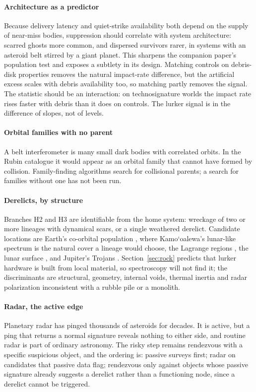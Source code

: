 \documentclass[preprint,12pt]{elsarticle}
\theoremstyle{definition}
\begin{document}
\paragraph{Architecture as a predictor} Because delivery latency and quiet-strike availability both depend on the supply of near-miss bodies, suppression should correlate with system architecture: scarred ghosts more common, and dispersed survivors rarer, in systems with an asteroid belt stirred by a giant planet. This sharpens the companion paper's population test and exposes a subtlety in its design. Matching controls on debris-disk properties removes the natural impact-rate difference, but the artificial excess scales with debris availability too, so matching partly removes the signal. The statistic should be an interaction: on technosignature worlds the impact rate rises faster with debris than it does on controls. The lurker signal is in the difference of slopes, not of levels.

\paragraph{Orbital families with no parent} A belt interferometer is many small dark bodies with correlated orbits. In the Rubin catalogue it would appear as an orbital family that cannot have formed by collision. Family-finding algorithms search for collisional parents; a search for families without one has not been run.

\paragraph{Derelicts, by structure} Branches H2 and H3 are identifiable from the home system: wreckage of two or more lineages with dynamical scars, or a single weathered derelict. Candidate locations are Earth's co-orbital population \citep{Benford2019}, where Kamo`oalewa's lunar-like spectrum \citep{Sharkey2021} is the natural cover a lineage would choose, the Lagrange regions \citep{HaqqMisraKopparapu2012}, the lunar surface \citep{DaviesWagner2013,Ellery2025}, and Jupiter's Trojans \citep{Levison2021}. Section~\ref{sec:rock} predicts that lurker hardware is built from local material, so spectroscopy will not find it; the discriminants are structural, geometry, internal voids, thermal inertia and radar polarization inconsistent with a rubble pile or a monolith.

\paragraph{Radar, the active edge} Planetary radar has pinged thousands of asteroids for decades. It is active, but a ping that returns a normal signature reveals nothing to either side, and routine radar is part of ordinary astronomy. The risky step remains rendezvous with a specific suspicious object, and the ordering is: passive surveys first; radar on candidates that passive data flag; rendezvous only against objects whose passive signature already suggests a derelict rather than a functioning node, since a derelict cannot be triggered.
\end{document}
